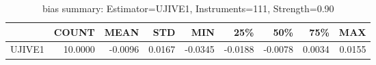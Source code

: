\begin{table}[ht]
\centering
\caption{bias summary: Estimator=UJIVE1, Instruments=111, Strength=0.90}
\begin{tabular}{lrrrrrrrr}
\toprule
 & COUNT & MEAN & STD & MIN & 25\% & 50\% & 75\% & MAX \\
\midrule
UJIVE1 & 10.0000 & -0.0096 & 0.0167 & -0.0345 & -0.0188 & -0.0078 & 0.0034 & 0.0155 \\
\bottomrule
\end{tabular}
\end{table}
